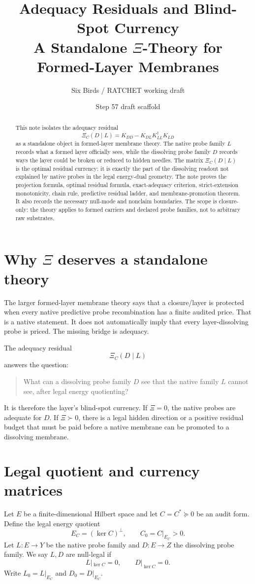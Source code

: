 \documentclass[11pt]{article}
\title{Adequacy Residuals and Blind-Spot Currency\\
A Standalone \texorpdfstring{$\Xi$}{Xi}-Theory for Formed-Layer Membranes}
\author{Six Birds / RATCHET working draft}
\date{Step 57 draft scaffold}
\begin{document}
\maketitle

\begin{abstract}
This note isolates the adequacy residual
\[
\Xi_C(D\mid L)=K_{DD}-K_{DL}K_{LL}^{\dagger}K_{LD}
\]
as a standalone object in formed-layer membrane theory.  The native probe family
\(L\) records what a formed layer officially sees, while the dissolving probe family
\(D\) records ways the layer could be broken or reduced to hidden needles.  The
matrix \(\Xi_C(D\mid L)\) is the optimal residual currency: it is exactly the part
of the dissolving readout not explained by native probes in the legal energy-dual
geometry.  The note proves the projection formula, optimal residual formula,
exact-adequacy criterion, strict-extension monotonicity, chain rule, predictive
residual ladder, and membrane-promotion theorem.  It also records the necessary
null-mode and nonclaim boundaries.  The scope is closure-only: the theory applies
to formed carriers and declared probe families, not to arbitrary raw substrates.
\end{abstract}

\section{Why \texorpdfstring{$\Xi$}{Xi} deserves a standalone theory}
The larger formed-layer membrane theory says that a closure/layer is protected
when every native predictive probe recombination has a finite audited price.  That
is a native statement.  It does not automatically imply that every layer-dissolving
probe is priced.  The missing bridge is adequacy.

The adequacy residual
\[
\Xi_C(D\mid L)
\]
answers the question:
\begin{quote}
What can a dissolving probe family \(D\) see that the native family \(L\) cannot
see, after legal energy quotienting?
\end{quote}
It is therefore the layer's blind-spot currency.  If \(\Xi=0\), the native probes
are adequate for \(D\).  If \(\Xi\succ0\), there is a legal hidden direction or a
positive residual budget that must be paid before a native membrane can be
promoted to a dissolving membrane.

\section{Legal quotient and currency matrices}
Let \(E\) be a finite-dimensional Hilbert space and let \(C=C^*\succeq0\) be an
audit form.  Define the legal energy quotient
\[
E_C=(\ker C)^\perp,
\qquad
C_0=C|_{E_C}>0.
\]
Let \(L:E\to Y\) be the native probe family and \(D:E\to Z\) the dissolving probe
family.  We say \(L,D\) are null-legal if
\[
L|_{\ker C}=0,
\qquad
D|_{\ker C}=0.
\]
Write \(L_0=L|_{E_C}\) and \(D_0=D|_{E_C}\).
\end{document}
